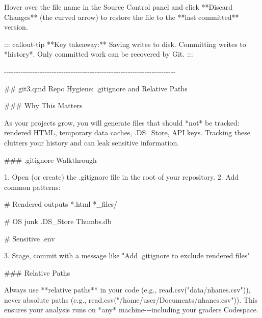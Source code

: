 \documentclass[
  letterpaper,
  DIV=11,
  numbers=noendperiod,
  oneside]{scrreprt}
\newenvironment{Shaded}{\begin{snugshade}}{\end{snugshade}}
\newcommand{\FunctionTok}[1]{\textcolor[rgb]{0.28,0.35,0.67}{#1}}
\newcommand{\InformationTok}[1]{\textcolor[rgb]{0.37,0.37,0.37}{#1}}
\newcommand{\NormalTok}[1]{\textcolor[rgb]{0.00,0.23,0.31}{#1}}
\newcommand{\SpecialStringTok}[1]{\textcolor[rgb]{0.13,0.47,0.30}{#1}}
\begin{document}
\begin{Shaded}
\begin{Highlighting}[numbers=left,,]
\NormalTok{Hover over the file name in the Source Control panel and click **Discard Changes** (the curved arrow) to restore the file to the **last committed** version.}

\NormalTok{::: callout{-}tip}
\NormalTok{**Key takeaway:** Saving writes to disk. Committing writes to *history*. Only committed work can be recovered by Git.}
\NormalTok{:::}

\NormalTok{{-}{-}{-}{-}{-}{-}{-}{-}{-}{-}{-}{-}{-}{-}{-}{-}{-}{-}{-}{-}{-}{-}{-}{-}{-}{-}{-}{-}{-}{-}{-}{-}{-}{-}{-}{-}{-}{-}{-}{-}{-}{-}{-}{-}{-}{-}{-}{-}{-}{-}{-}{-}{-}{-}{-}{-}{-}{-}{-}{-}{-}{-}{-}{-}{-}{-}{-}{-}{-}{-}{-}{-}}

\FunctionTok{\#\# \textasciigrave{}git3.qmd\textasciigrave{} Repo Hygiene: \textasciigrave{}.gitignore\textasciigrave{} and Relative Paths}

\FunctionTok{\#\#\# Why This Matters}

\NormalTok{As your projects grow, you will generate files that should *not* be tracked: rendered HTML, temporary data caches, }\InformationTok{\textasciigrave{}.DS\_Store\textasciigrave{}}\NormalTok{, API keys. Tracking these clutters your history and can leak sensitive information.}

\FunctionTok{\#\#\# \textasciigrave{}.gitignore\textasciigrave{} Walkthrough}

\SpecialStringTok{1.  }\NormalTok{Open (or create) the }\InformationTok{\textasciigrave{}.gitignore\textasciigrave{}}\NormalTok{ file in the root of your repository.}
\SpecialStringTok{2.  }\NormalTok{Add common patterns:}

\InformationTok{\textasciigrave{}\textasciigrave{}\textasciigrave{}         }
\InformationTok{\# Rendered outputs}
\InformationTok{*.html}
\InformationTok{*\_files/}

\InformationTok{\# OS junk}
\InformationTok{.DS\_Store}
\InformationTok{Thumbs.db}

\InformationTok{\# Sensitive}
\InformationTok{.env}
\InformationTok{\textasciigrave{}\textasciigrave{}\textasciigrave{}}

\SpecialStringTok{3.  }\NormalTok{Stage, commit with a message like }\InformationTok{\textasciigrave{}"Add .gitignore to exclude rendered files"\textasciigrave{}}\NormalTok{.}

\FunctionTok{\#\#\# Relative Paths}

\NormalTok{Always use **relative paths** in your code (e.g., }\InformationTok{\textasciigrave{}read.csv("data/nhanes.csv")\textasciigrave{}}\NormalTok{), never absolute paths (e.g., }\InformationTok{\textasciigrave{}read.csv("/home/user/Documents/nhanes.csv")\textasciigrave{}}\NormalTok{). This ensures your analysis runs on *any* machine{-}{-}{-}including your grader\textquotesingle{}s Codespace.}


\end{Highlighting}
\end{Shaded}
\end{document}

